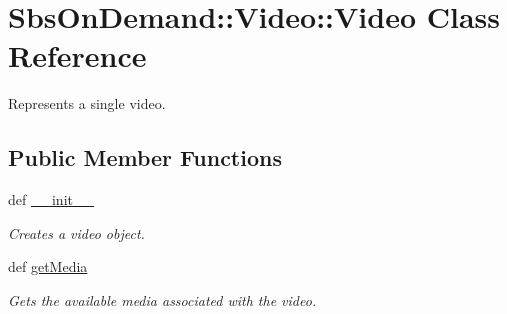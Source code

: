 \hypertarget{class_sbs_on_demand_1_1_video_1_1_video}{
\section{\-Sbs\-On\-Demand\-:\-:\-Video\-:\-:\-Video \-Class \-Reference}
\label{class_sbs_on_demand_1_1_video_1_1_video}
}


\-Represents a single video.  


\subsection*{\-Public \-Member \-Functions}
\begin{DoxyCompactItemize}
\item 
def \hyperlink{class_sbs_on_demand_1_1_video_1_1_video_a34899fdf20a97311d1e7dbc04d251ebc}{\-\_\-\-\_\-init\-\_\-\-\_\-}
\begin{DoxyCompactList}\small\item\em \-Creates a video object. \end{DoxyCompactList}\item 
def \hyperlink{class_sbs_on_demand_1_1_video_1_1_video_a09aeecba9b9c1bd4b33b0f0c8d20a4ed}{get\-Media}
\begin{DoxyCompactList}\small\item\em \-Gets the available media associated with the video. \end{DoxyCompactList}\end{DoxyCompactItemize}
